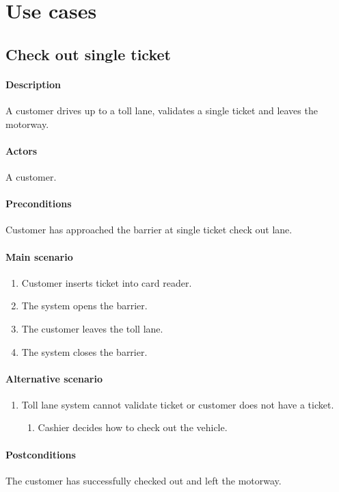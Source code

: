 \documentclass{report}
\begin{document}
\section{Use cases}
\subsection{Check out single ticket}
\paragraph{Description}
A customer drives up to a toll lane, validates a single ticket and leaves the motorway. 
\paragraph{Actors}
A customer.
\paragraph{Preconditions}
Customer has approached the barrier at single ticket check out lane. 
\paragraph{Main scenario}
\begin{enumerate}
\item Customer inserts ticket into card reader.
\item The system opens the  barrier.
\item The customer leaves the toll lane.
\item The system closes the barrier.
\end{enumerate}
\paragraph{Alternative scenario}
\begin{enumerate}
\item Toll lane system cannot validate ticket or customer does not have a ticket.
\begin{enumerate}
\item Cashier decides how to check out the vehicle.
\end{enumerate}
\end{enumerate}
\paragraph{Postconditions}
The customer has successfully checked out and left the motorway.
\end{document}
